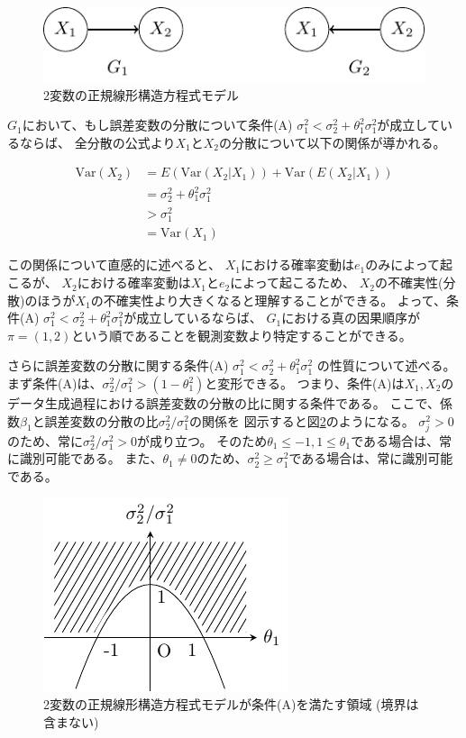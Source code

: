 \begin{figure}[h]
  \centering
  \includegraphics{./picture/bivariate_SEM.pdf}
  \caption{2変数の正規線形構造方程式モデル}
  \label{fig:ex_bivariate_SEM}
\end{figure}

$G_1$において、もし誤差変数の分散について条件(A)
$\sigma_1^2 < \sigma_2^2 + \theta_1^2 \sigma_1^2$が成立しているならば、
全分散の公式より$X_1$と$X_2$の分散について以下の関係が導かれる。

\begin{align*}
  \mathrm{Var}(X_2) &= E(\mathrm{Var}(X_2|X_1)) + \mathrm{Var}(E(X_2|X_1)) \\
                    &= \sigma_2^2 + \theta_1^2 \sigma_1^2 \\
                    &> \sigma_1^2 \\
                    &= \mathrm{Var}(X_1)
\end{align*}

この関係について直感的に述べると、
$X_1$における確率変動は$e_1$のみによって起こるが、
$X_2$における確率変動は$X_1$と$e_2$によって起こるため、
$X_2$の不確実性(分散)のほうが$X_1$の不確実性より大きくなると理解することができる。
よって、条件(A) $\sigma_1^2 < \sigma_2^2 + \theta_1^2 \sigma_1^2$が成立しているならば、
$G_1$における真の因果順序が$\pi = (1,2)$という順であることを観測変数より特定することができる。

さらに誤差変数の分散に関する条件(A) $\sigma_1^2 < \sigma_2^2 + \theta_1^2 \sigma_1^2$
の性質について述べる。
まず条件(A)は、$\sigma_2^2 / \sigma_1^2 > (1-\theta_1^2)$と変形できる。
つまり、条件(A)は$X_1, X_2$のデータ生成過程における誤差変数の分散の比に関する条件である。
ここで、係数$\beta_1$と誤差変数の分散の比$\sigma_2^2/ \sigma_1^2$の関係を
図示すると図\ref{fig:error_ratio}のようになる。
$\sigma_j^2 > 0$のため、常に$\sigma_2^2/ \sigma_1^2 > 0$が成り立つ。
そのため$\theta_1 \leq -1, 1 \leq \theta_1$である場合は、常に識別可能である。
また、$\theta_1 \neq 0$のため、$\sigma_2^2 \geq \sigma_1^2$である場合は、常に識別可能である。

\begin{figure}[htb]
  \centering
  \includegraphics{./picture/error_ratio.pdf}
  \caption{2変数の正規線形構造方程式モデルが条件(A)を満たす領域 (境界は含まない)}
  \label{fig:error_ratio}
\end{figure}
